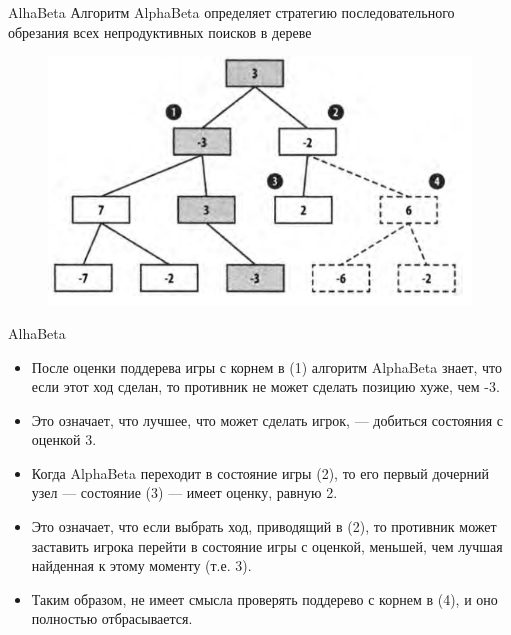 \documentclass{beamer}
\begin{document}
\begin{frame}{AlhaBeta}
Алгоритм AlphaBeta определяет стратегию последовательного обрезания всех непродуктивных поисков в дереве
\begin{figure}[h]
\centering
\includegraphics[scale=0.6]{images/lec05-pic08.png}
\end{figure}
\end{frame}

\begin{frame}{AlhaBeta}
\begin{itemize}
\item После оценки поддерева игры с корнем в (1) алгоритм AlphaBeta знает,
что если этот ход сделан, то противник не может сделать позицию хуже, чем -3.
\item Это означает, что лучшее, что может сделать игрок, — добиться состояния с оценкой 3. 
\item Когда AlphaBeta переходит в состояние игры (2), то его первый дочерний узел — состояние (3) — имеет оценку, равную 2. 
\item Это означает, что если выбрать ход, приводящий в (2), то противник может заставить игрока перейти в состояние игры с оценкой, меньшей, чем лучшая найденная к этому моменту (т.е. 3). 
\item Таким образом, не имеет смысла проверять поддерево с корнем в (4), и оно полностью отбрасывается.
\end{itemize}
\end{frame}
\end{document}
